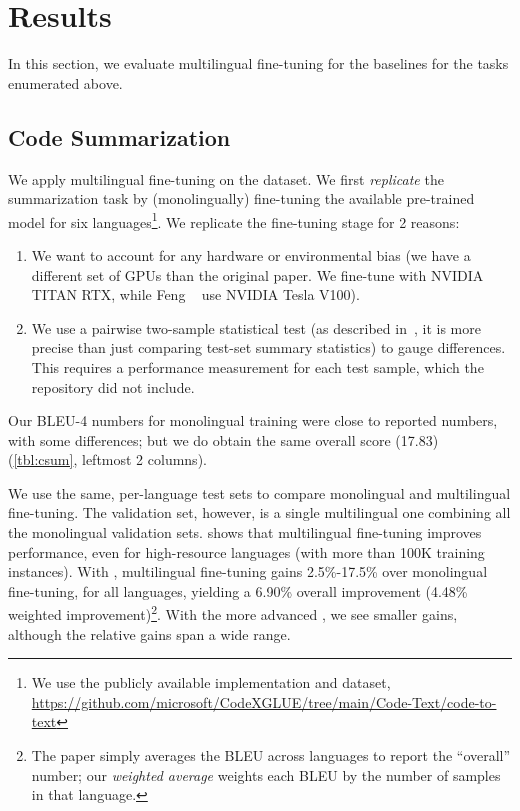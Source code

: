 

\section{Results}
In this section, we evaluate multilingual fine-tuning  for the baselines for the tasks enumerated above. 

\subsection{Code Summarization}
\label{csumr}


We apply multilingual fine-tuning on the \cxglue dataset. We first \emph{replicate} the summarization task by (monolingually) 
fine-tuning the available pre-trained \cbert 
model  for six languages\footnote{We use the publicly available \cbert implementation and dataset, \url{https://github.com/microsoft/CodeXGLUE/tree/main/Code-Text/code-to-text}}. 
We replicate the fine-tuning stage for 2 reasons: 

\begin{enumerate}
\item We want to account for any hardware or environmental bias (\eg we have a different set of GPUs than the original paper. We fine-tune with NVIDIA TITAN RTX, while Feng \etal~\cite{feng2020codebert} use NVIDIA Tesla V100). 
\item We use a pairwise two-sample statistical test (as described in~\cite{roy2021reassessing}, it is more precise than just comparing test-set summary statistics) to gauge differences. 
This requires a performance measurement for each test sample, which the repository did not include.
\end{enumerate}  
Our BLEU-4 numbers  for monolingual training
were close to reported numbers, with some differences; but we do obtain the same overall score (17.83) (\cref{tbl:csum}, leftmost 2 columns). 

We use the same, per-language test sets to compare  monolingual and multilingual fine-tuning. 
The validation set, however, is a single multilingual one combining all the monolingual validation sets. 
 shows that multilingual fine-tuning improves performance, even for high-resource languages (with more than 100K training instances). 
With \cbert, multilingual fine-tuning gains 2.5\%-17.5\% over monolingual fine-tuning, 
for all languages,  yielding a  6.90\% overall improvement (4.48\% weighted improvement)\footnote{The \cbert paper simply averages the BLEU across languages to report the ``overall'' number; our \emph{weighted average}  weights each BLEU by the number of samples in that language.}. 
 With the more advanced \gcbert, we  see  smaller gains, although the relative gains span a wide range. 




